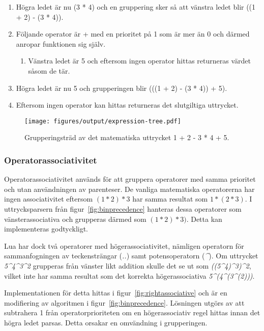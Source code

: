 \begin{enumerate}
\begin{enumerate}
    \end{enumerate}
  \item Högra ledet är nu (3 * 4) och en gruppering sker så att vänstra ledet
    blir ((1 + 2) - (3 * 4)).
  \item Följande operator är + med en prioritet på 1 som är mer än 0 och
    därmed anropar funktionen sig själv.
    \begin{enumerate}
      \item Vänstra ledet är 5 och eftersom ingen operator hittas returneras
        värdet såsom de tär.
    \end{enumerate}
  \item Högra ledet är nu 5 och grupperingen blir (((1 + 2) - (3 * 4)) + 5).
  \item Eftersom ingen operator kan hittas returneras det slutgiltiga
    uttrycket.
\end{enumerate}

\begin{figure}[ht]
  \texttt{[image: figures/output/expression-tree.pdf]}
  \caption{Grupperingsträd av det matematiska uttrycket 1 + 2 - 3 * 4 + 5.}
  \label{fig:expressiontree}
\end{figure}

\subsubsection{Operatorassociativitet}

Operatorassociativitet används för att gruppera operatorer med samma prioritet
och utan användningen av parenteser. De vanliga matematiska operatorerna har ingen
associativitet eftersom $(1 * 2) * 3$ har samma resultat som $1 * (2 * 3)$. I
uttrycksparsern från figur~\ref{fig:binprecedence} hanteras dessa operatorer
som vänsterassociativa och grupperas därmed som $(1 * 2) * 3)$. Detta kan
implementeras godtyckligt.

Lua har dock två operatorer med högerassociativitet, nämligen operatorn för
sammanfogningen av teckensträngar (\textit{..}) samt potensoperatorn
(\textit{\^{}}). Om uttrycket \textit{5\^{}4\^{}3\^{}2} grupperas från vänster likt
addition skulle det se ut som \textit{((5\^{}4)\^{}3)\^{}2}, vilket inte har
samma resultat som det korrekta högerassociativa \textit{5\^{}(4\^{}(3\^{}(2)))}.

Implementationen för detta hittas i figur~\ref{fig:rightassociative} och är en
modifiering av algoritmen i figur~\ref{fig:binprecedence}. Lösningen utgörs av
att subtrahera 1 från operatorprioriteten om en högerassociativ regel hittas
innan det högra ledet parsas. Detta orsakar en omvändning i grupperingen.

